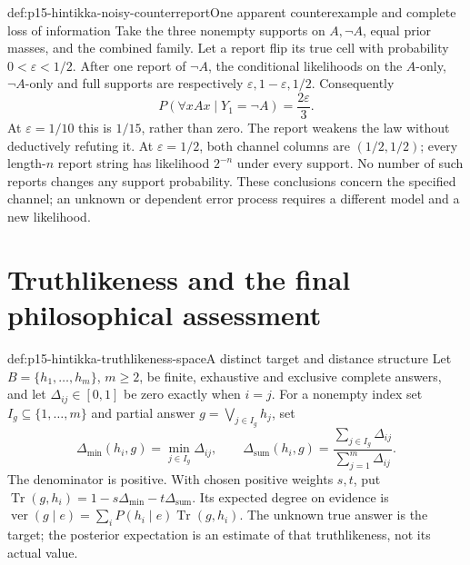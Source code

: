 \begin{hbexample}{def:p15-hintikka-noisy-counterreport}{One apparent counterexample and complete loss of information}
Take the three nonempty supports on \(A,\neg A\), equal prior masses,
and the combined family. Let a report flip its true cell with probability
\(0<\varepsilon<1/2\). After one report of \(\neg A\), the
conditional likelihoods on the \(A\)-only, \(\neg A\)-only and
full supports are respectively \(\varepsilon,1-\varepsilon,1/2\).
Consequently
\[
 P(\forall xAx\mid Y_1=\neg A)=\frac{2\varepsilon}{3}.
\]
At \(\varepsilon=1/10\) this is \(1/15\), rather than zero.
The report weakens the law without deductively refuting it. At
\(\varepsilon=1/2\), both channel columns are \((1/2,1/2)\);
every length-\(n\) report string has likelihood \(2^{-n}\) under
every support. No number of such reports changes any support probability.
These conclusions concern the specified channel; an unknown or dependent
error process requires a different model and a new likelihood.
\end{hbexample}


\section{Truthlikeness and the final philosophical assessment}
\label{sec:p15-hintikka-truthlikeness}

\begin{hbdefinition}{def:p15-hintikka-truthlikeness-space}{A distinct target and distance structure}
Let \(B=\{h_1,\ldots,h_m\}\), \(m\geq2\), be finite,
exhaustive and exclusive complete answers, and let
\(\Delta_{ij}\in[0,1]\) be zero exactly when \(i=j\).
For a nonempty index set \(I_g\subseteq\{1,\ldots,m\}\) and
partial answer \(g=\bigvee_{j\in I_g}h_j\),
set
\[
 \Delta_{\min}(h_i,g)=\min_{j\in I_g}\Delta_{ij},\qquad
 \Delta_{\mathrm{sum}}(h_i,g)=
              \frac{\sum_{j\in I_g}\Delta_{ij}}{\sum_{j=1}^{m}\Delta_{ij}}.
\]
The denominator is positive. With chosen positive weights \(s,t\),
put \(\operatorname{Tr}(g,h_i)=1-s\Delta_{\min}-t\Delta_{\mathrm{sum}}\).
Its expected degree on evidence is
\(\operatorname{ver}(g\mid e)=\sum_iP(h_i\mid e)\operatorname{Tr}(g,h_i)\).
The unknown true answer is the target; the posterior expectation is
an estimate of that truthlikeness, not its actual value.
\end{hbdefinition}

